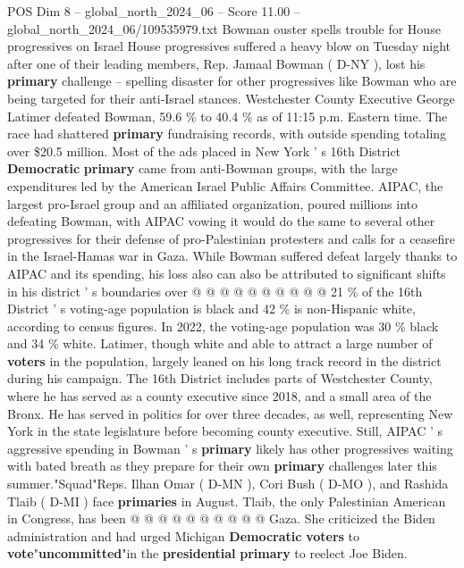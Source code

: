 \begin{textsample}{POS Dim 8 – global\_north\_2024\_06 – Score 11.00 – global\_north\_2024\_06/109535979.txt}  \label{ex:f8_pos_068}
Bowman ouster spells trouble for House progressives on Israel House progressives suffered a heavy blow on Tuesday night after one of their leading members, Rep.
Jamaal Bowman ( D-NY ), lost his \textbf{primary} challenge -- spelling disaster for other progressives like Bowman who are being targeted for their anti-Israel stances.
Westchester County Executive George Latimer defeated Bowman, 59.6 \% to 40.4 \% as of 11:15 p.m.
Eastern time.
The race had shattered \textbf{primary} fundraising records, with outside spending totaling over \$20.5 million.
Most of the ads placed in New York ' s 16th District \textbf{Democratic} \textbf{primary} came from anti-Bowman groups, with the large expenditures led by the American Israel Public Affairs Committee.
AIPAC, the largest pro-Israel group and an affiliated organization, poured millions into defeating Bowman, with AIPAC vowing it would do the same to several other progressives for their defense of pro-Palestinian protesters and calls for a ceasefire in the Israel-Hamas war in Gaza.
While Bowman suffered defeat largely thanks to AIPAC and its spending, his loss also can also be attributed to significant shifts in his district ' s boundaries over @ @ @ @ @ @ @ @ @ @ 21 \% of the 16th District ' s voting-age population is black and 42 \% is non-Hispanic white, according to census figures.
In 2022, the voting-age population was 30 \% black and 34 \% white.
Latimer, though white and able to attract a large number of \textbf{voters} in the population, largely leaned on his long track record in the district during his campaign.
The 16th District includes parts of Westchester County, where he has served as a county executive since 2018, and a small area of the Bronx.
He has served in politics for over three decades, as well, representing New York in the state legislature before becoming county executive.
Still, AIPAC ' s aggressive spending in Bowman ' s \textbf{primary} likely has other progressives waiting with bated breath as they prepare for their own \textbf{primary} challenges later this summer."Squad"Reps.
Ilhan Omar ( D-MN ), Cori Bush ( D-MO ), and Rashida Tlaib ( D-MI ) face \textbf{primaries} in August.
Tlaib, the only Palestinian American in Congress, has been @ @ @ @ @ @ @ @ @ @ Gaza.
She criticized the Biden administration and had urged Michigan \textbf{Democratic} \textbf{voters} to \textbf{vote}"\textbf{uncommitted}"in the \textbf{presidential} \textbf{primary} to reelect Joe Biden.

\end{textsample}
